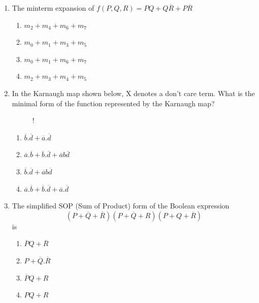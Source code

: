 \documentclass[journal,12pt,twocolumn]{IEEEtran}
\begin{document}
\begin{enumerate}
   
    \item The minterm expansion of $f(P,Q,R)=PQ+Q\overline{R}+P\overline{R}$
     \begin{enumerate}
      \item $m_{2}+m_{4}+m_{6}+m_{7}$ 
      \item $m_{0}+m_{1}+m_{3}+m_{5}$
      \item $m_{0}+m_{1}+m_{6}+m_{7}$
      \item $m_{2}+m_{3}+m_{4}+m_{5}$
    \end{enumerate}
        \item In the Karnaugh map shown below, X denotes a don't care term. What is the
minimal form of the function represented by the Karnaugh map?
\begin{figure}[!h]
\centering
\resizebox {\columnwidth} {!} {

}
\caption{}
\end{figure}
     \begin{enumerate}
      \item $\overline{b}.\overline{d}+\overline{a}.\overline{d}$ 
      \item $\overline{a}.\overline{b}+\overline{b}.\overline{d}+\overline{a}b\overline{d}$
      \item $\overline{b}.\overline{d}+\overline{a}b\overline{d}$
      \item $\overline{a}.\overline{b}+\overline{b}.\overline{d}+\overline{a}.\overline{d}$
    \end{enumerate}
    \item The simplified SOP (Sum of Product) form of the Boolean expression
    $$(P+\overline{Q}+\overline{R})(P+\overline{Q}+R)(P+Q+\overline{R})$$ is
    \begin{enumerate}
      \item $\overline{P}Q+\overline{R}$ 
      \item $P+\overline{Q}.\overline{R}$
      \item $\overline{P}Q+R$
      \item $PQ+R$
    \end{enumerate}


\end{enumerate}
\end{document}
